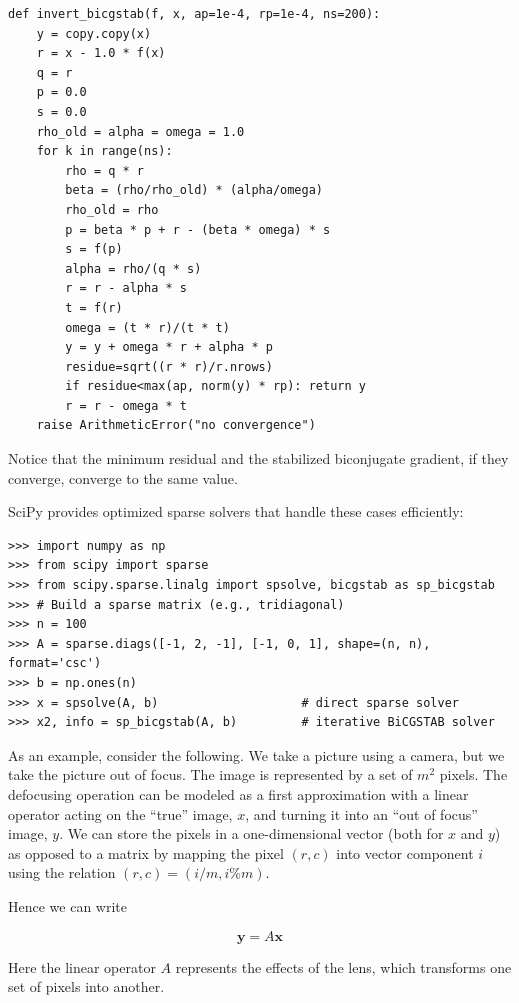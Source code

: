 \documentclass[justified, sixbynine]{tufte-book}
\def\ft{\small\tt}
\theoremstyle{plain}%
\newtheorem * {corollary}{Corollary}
\theoremstyle{definition}
\theoremstyle{remark}
\newtheorem * {remark}{Remark}
\newtheorem * {note}{Note}
\begin{document}
\begin{fullwidth}
\begin{lstlisting}[caption={in file: {\ft nlib.py}}]
def invert_bicgstab(f, x, ap=1e-4, rp=1e-4, ns=200):
    y = copy.copy(x)
    r = x - 1.0 * f(x)
    q = r
    p = 0.0
    s = 0.0
    rho_old = alpha = omega = 1.0
    for k in range(ns):
        rho = q * r
        beta = (rho/rho_old) * (alpha/omega)
        rho_old = rho
        p = beta * p + r - (beta * omega) * s
        s = f(p)
        alpha = rho/(q * s)
        r = r - alpha * s
        t = f(r)
        omega = (t * r)/(t * t)
        y = y + omega * r + alpha * p
        residue=sqrt((r * r)/r.nrows)
        if residue<max(ap, norm(y) * rp): return y
        r = r - omega * t
    raise ArithmeticError("no convergence")
\end{lstlisting}

Notice that the minimum residual and the stabilized biconjugate gradient, if they converge, converge to the same value.

SciPy provides optimized sparse solvers that handle these cases efficiently:

\begin{lstlisting}
>>> import numpy as np
>>> from scipy import sparse
>>> from scipy.sparse.linalg import spsolve, bicgstab as sp_bicgstab
>>> # Build a sparse matrix (e.g., tridiagonal)
>>> n = 100
>>> A = sparse.diags([-1, 2, -1], [-1, 0, 1], shape=(n, n), format='csc')
>>> b = np.ones(n)
>>> x = spsolve(A, b)                    # direct sparse solver
>>> x2, info = sp_bicgstab(A, b)         # iterative BiCGSTAB solver
\end{lstlisting}

As an example, consider the following. We take a picture using a camera, but we take the picture out of focus. The image is represented by a set of $m^2$ pixels. The defocusing operation can be modeled as a first approximation with a linear operator acting on the ``true'' image, $x$, and turning it into an ``out of focus'' image, $y$. We can store the pixels in a one-dimensional vector (both for $x$ and $y$) as opposed to a matrix by mapping the pixel $(r, c)$ into vector component $i$ using the relation $(r, c) = (i/m, i\%m)$.

Hence we can write

\begin{equation}
\mathbf{y} = A \mathbf{x}
\end{equation}

Here the linear operator $A$ represents the effects of the lens, which transforms one set of pixels into another.


\end{fullwidth}
\end{document}
